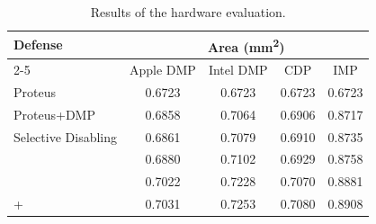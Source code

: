 \begin{table}[t]
  \centering
  \caption{Results of the hardware evaluation.}
  \label{tab:hardware-evaluation}
  \begin{tabular}{l c c c c}\toprule
    \multirow{2}{*}{Defense} & \multicolumn{4}{c}{Area (\si{\milli\meter\squared})} \\
  \cmidrule(lr){2-5}
     & Apple DMP & Intel DMP & CDP & IMP \\ \midrule
    Proteus & 0.6723 & 0.6723 & 0.6723 & 0.6723 \\
    Proteus+DMP & 0.6858 & 0.7064 & 0.6906 & 0.8717 \\
    Selective Disabling & 0.6861 & 0.7079 & 0.6910 & 0.8735 \\
    \secdmp{} & 0.6880 & 0.7102 & 0.6929 & 0.8758 \\
    \prospect{} & 0.7022 & 0.7228 & 0.7070 & 0.8881 \\
    \prospect{}+\secdmp{} & 0.7031 & 0.7253 & 0.7080 & 0.8908 \\
    \bottomrule
  \end{tabular}
\end{table}
